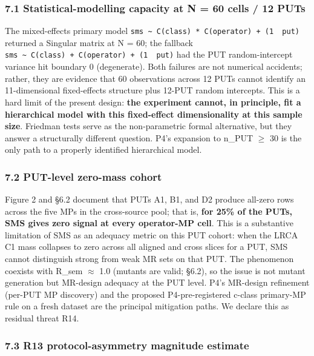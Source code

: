 \documentclass[review,12pt,authoryear]{elsarticle}
\begin{document}
\subsubsection{7.1 Statistical-modelling capacity at N = 60 cells / 12 PUTs}\label{statistical-modelling-capacity-at-n-60-cells-12-puts}

The mixed-effects primary model
\texttt{sms\ \textasciitilde{}\ C(class)\ *\ C(operator)\ +\ (1\ \textbar{}\ put)}
returned a Singular matrix at N = 60; the fallback
\texttt{sms\ \textasciitilde{}\ C(class)\ +\ C(operator)\ +\ (1\ \textbar{}\ put)}
had the PUT random-intercept variance hit boundary 0 (degenerate). Both
failures are not numerical accidents; rather, they are evidence that 60
observations across 12 PUTs cannot identify an 11-dimensional
fixed-effects structure plus 12-PUT random intercepts. This is a hard
limit of the present design: \textbf{the experiment cannot, in
principle, fit a hierarchical model with this fixed-effect
dimensionality at this sample size}. Friedman tests serve as the
non-parametric formal alternative, but they answer a structurally
different question. P4's expansion to n\_PUT $\geq$ 30 is the only path to a
properly identified hierarchical model.

\subsubsection{7.2 PUT-level zero-mass cohort}\label{put-level-zero-mass-cohort}

Figure 2 and §6.2 document that PUTs A1, B1, and D2 produce all-zero
rows across the five MPs in the cross-source pool; that is,
\textbf{for 25\% of the PUTs, SMS gives zero signal at every operator-MP
cell}. This is a substantive limitation of SMS as an adequacy metric on
this PUT cohort: when the LRCA C1 mass collapses to zero across all
aligned and cross slices for a PUT, SMS cannot distinguish strong from
weak MR sets on that PUT. The phenomenon coexists with R\_sem $\approx$ 1.0
(mutants are valid; §6.2), so the issue is not mutant generation but
MR-design adequacy at the PUT level. P4's MR-design refinement (per-PUT
MP discovery) and the proposed P4-pre-registered c-class primary-MP rule
on a fresh dataset are the principal mitigation paths. We declare this
as residual threat R14.

\subsubsection{7.3 R13 protocol-asymmetry magnitude estimate}\label{r13-protocol-asymmetry-magnitude-estimate}
\end{document}
